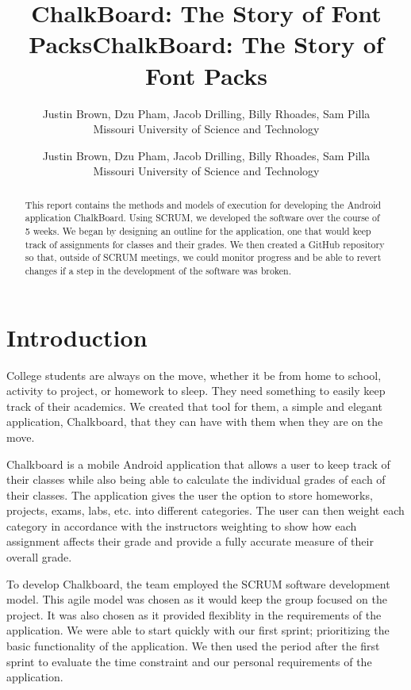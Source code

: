 \documentclass[a4paper]{article} %
\title{ChalkBoard: The Story of Font Packs}
\author{Justin Brown, Dzu Pham, Jacob Drilling, Billy Rhoades, Sam Pilla \\ %
       Missouri University of Science and Technology %
       }%
\date{}
\title{\vspace{30mm}ChalkBoard: The Story of Font Packs}
\author{Justin Brown, Dzu Pham, Jacob Drilling, Billy Rhoades, Sam Pilla \\%
       Missouri University of Science and Technology%
       }%
\begin{document}
\maketitle

\pagebreak

\tableofcontents

\pagebreak

\setlength\parindent{0pt}


\begin{abstract}

This report contains the methods and models of execution for developing the Android application ChalkBoard. Using SCRUM, we developed the software over the course of 5 weeks. We began by designing an outline for the application, one that would keep track of assignments for classes and their grades. We then created a GitHub repository so that, outside of SCRUM meetings, we could monitor progress and be able to revert changes if a step in the development of the software was broken.

\end{abstract}

\section{Introduction}

College students are always on the move, whether it be from home to school, activity to project, or homework to sleep. They need something to easily keep track of their academics. We created that tool for them, a simple and elegant application, Chalkboard, that they can have with them when they are on the move.


Chalkboard is a mobile Android application that allows a user to keep track of their classes while also being able to calculate the individual grades of each of their classes. The application gives the user the option to store homeworks, projects, exams, labs, etc. into different categories. The user can then weight each category in accordance with the instructors weighting to show how each assignment affects their grade and provide a fully accurate measure of their overall grade. 

To develop Chalkboard, the team employed the SCRUM software development model. This agile model was chosen as it would keep the group focused on the project. It was also chosen as it provided flexiblity in the requirements of the application. We were able to start quickly with our first sprint; prioritizing the basic functionality of the application. We then used the period after the first sprint to evaluate the time constraint and our personal requirements of the application.
\end{document}
